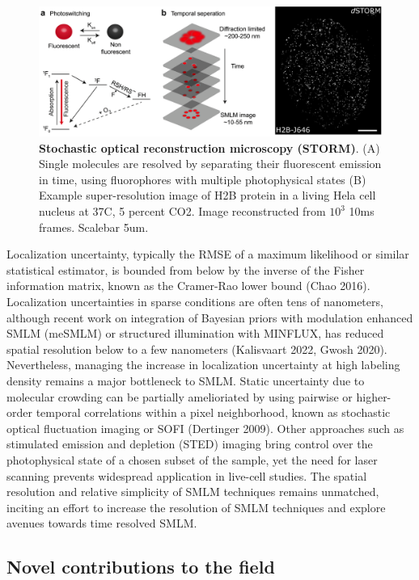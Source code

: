 \documentclass{ucetd}
\begin{document}
\begin{figure}
\includegraphics[width=\textwidth]{Intro.png}
\caption{\textbf{Stochastic optical reconstruction microscopy (STORM)}. (A) Single molecules are resolved by separating their fluorescent emission in time, using fluorophores with multiple photophysical states (B) Example super-resolution image of H2B protein in a living Hela cell nucleus at 37C, 5 percent CO2. Image reconstructed from $10^{3}$ 10ms frames. Scalebar 5um.}
\end{figure}

Localization uncertainty, typically the RMSE of a maximum likelihood or similar statistical estimator, is bounded from below by the inverse of the Fisher information matrix, known as the Cramer-Rao lower bound (Chao 2016). Localization uncertainties in sparse conditions are often tens of nanometers, although recent work on integration of Bayesian priors with modulation enhanced SMLM (meSMLM) or structured illumination with MINFLUX, has reduced spatial resolution below to a few nanometers (Kalisvaart 2022, Gwosh 2020). Nevertheless, managing the increase in localization uncertainty at high labeling density remains a major bottleneck to SMLM. Static uncertainty due to molecular crowding can be partially amelioriated by using pairwise or higher-order temporal correlations within a pixel neighborhood, known as stochastic optical fluctuation imaging or SOFI (Dertinger 2009). Other approaches such as stimulated emission and depletion (STED) imaging bring control over the photophysical state of a chosen subset of the sample, yet the need for laser scanning prevents widespread application in live-cell studies. The spatial resolution and relative simplicity of SMLM techniques remains unmatched, inciting an effort to increase the resolution of SMLM techniques and explore avenues towards time resolved SMLM.

\subsection{Novel contributions to the field}
\end{document}
